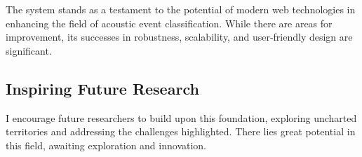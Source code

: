 The system stands as a testament to the potential of modern web technologies in enhancing the field of acoustic event classification. While there are areas for improvement, its successes in robustness, scalability, and user-friendly design are significant.

\subsection{Inspiring Future Research}

I encourage future researchers to build upon this foundation, exploring uncharted territories and addressing the challenges highlighted. There lies great potential in this field, awaiting exploration and innovation.